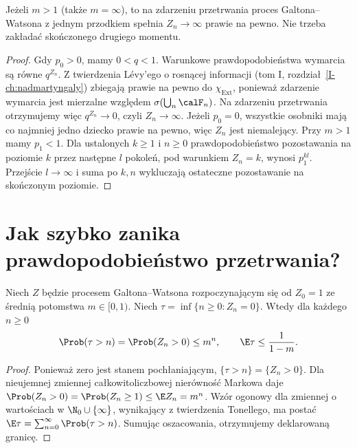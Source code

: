 \begin{wniosek}
Jeżeli $m>1$ (także $m=\infty$), to na zdarzeniu
przetrwania proces Galtona--Watsona z jednym
przodkiem spełnia $Z_n\to\infty$ prawie na pewno.
Nie trzeba zakładać skończonego drugiego momentu.
\end{wniosek}
\begin{proof}
Gdy $p_0>0$, mamy $0<q<1$. Warunkowe
prawdopodobieństwa wymarcia są równe $q^{Z_n}$.
Z twierdzenia Lévy'ego o rosnącej informacji
(tom I, rozdział~\ref{I-ch:nadmartyngaly})
zbiegają prawie na pewno do
$\chi_{\mathrm{Ext}}$, ponieważ zdarzenie
wymarcia jest mierzalne względem
$\sigma(\bigcup_n\calF_n)$.
Na zdarzeniu przetrwania otrzymujemy więc
$q^{Z_n}\to0$, czyli $Z_n\to\infty$.
Jeżeli $p_0=0$, wszystkie osobniki mają co najmniej
jedno dziecko prawie na pewno, więc $Z_n$ jest
niemalejący. Przy $m>1$ mamy $p_1<1$.
Dla ustalonych $k\ge1$ i $n\ge0$ prawdopodobieństwo
pozostawania na poziomie $k$ przez następne $l$
pokoleń, pod warunkiem $Z_n=k$, wynosi $p_1^{kl}$.
Przejście $l\to\infty$ i suma po $k,n$ wykluczają
ostateczne pozostawanie na skończonym poziomie.
\end{proof}

\section{Jak szybko zanika prawdopodobieństwo przetrwania?}
\begin{stwierdzenie}
Niech $Z$ będzie procesem Galtona--Watsona rozpoczynającym się
od $Z_0=1$ ze średnią potomstwa $m\in[0,1)$.
Niech $\tau=\inf\{n\ge0:Z_n=0\}$.
Wtedy dla każdego $n\ge0$
\[
\Prob(\tau>n)=\Prob(Z_n>0)\le m^n,
\qquad \E\tau\le\frac{1}{1-m}.
\]
\end{stwierdzenie}
\begin{proof}
Ponieważ zero jest stanem pochłaniającym,
$\{\tau>n\}=\{Z_n>0\}$. Dla nieujemnej zmiennej
całkowitoliczbowej nierówność Markowa daje
$\Prob(Z_n>0)=\Prob(Z_n\ge1)\le\E Z_n=m^n$.
Wzór ogonowy dla zmiennej o wartościach w $\N_0\cup\{\infty\}$,
wynikający z twierdzenia Tonellego, ma postać
$\E\tau=\sum_{n=0}^\infty\Prob(\tau>n)$.
Sumując oszacowania, otrzymujemy deklarowaną granicę.
\end{proof}

